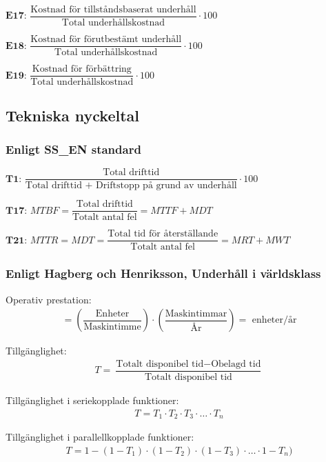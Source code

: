 		$\textbf{E17: } \dfrac{\text{Kostnad för tillståndsbaserat underhåll}}{\text{Total underhållskostnad}} \cdot 100$

		$\textbf{E18: } \dfrac{\text{Kostnad för förutbestämt underhåll}}{\text{Total underhållskostnad}} \cdot 100$

		$\textbf{E19: } \dfrac{\text{Kostnad för förbättring}}{\text{Total underhållskostnad}} \cdot 100$
\subsection*{Tekniska nyckeltal}
\subsubsection*{Enligt SS\_EN standard}
		$\textbf{T1: } \dfrac{\text{Total drifttid}}{\text{Total drifttid + Driftstopp på grund av underhåll}} \cdot 100$
	
		$\textbf{T17: } MTBF= \dfrac{\text{Total drifttid}}{\text{Totalt antal fel}} = MTTF + MDT$
	
		$\textbf{T21: } MTTR = MDT = \dfrac{\text{Total tid för återställande}}{\text{Totalt antal fel}} = MRT + MWT$
		\subsubsection*{Enligt Hagberg och Henriksson, Underhåll i världsklass}
		
			Operativ prestation: 
      \begin{align*}
        =\left( \dfrac{\text{Enheter}}{\text{Maskintimme}} \right) \cdot \left( \dfrac{\text{Maskintimmar}}{\text{År}} \right)= \text{ enheter/år}
      \end{align*}
			
			Tillgänglighet: 
      \begin{align*}
      T = \dfrac{\text{Totalt disponibel tid} - \text{Obelagd tid}}{\text{Totalt disponibel tid}}
      \end{align*}
			
			Tillgänglighet i seriekopplade funktioner: 
      \begin{align*}
      T = T_1 \cdot T_2 \cdot T_3 \cdot \ldots  \cdot T_n 
      \end{align*}
			
			Tillgänglighet i parallellkopplade funktioner: 
      \begin{align*}
      T = 1 - (1-T_1) \cdot (1-T_2) \cdot (1-T_3) \cdot \ldots  \cdot 1-T_n) 
      \end{align*}
			
